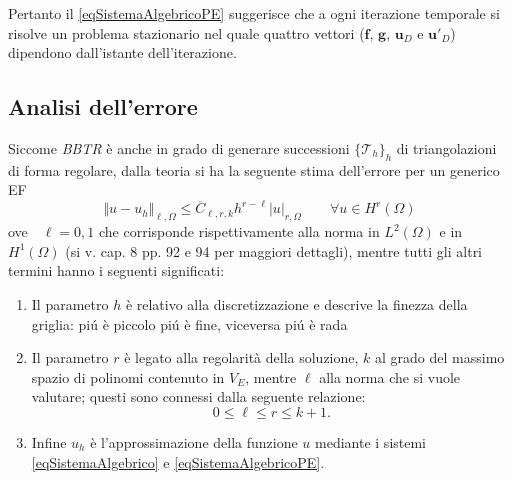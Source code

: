 \documentclass{article}
\begin{document}
            Pertanto il \eqref{eqSistemaAlgebricoPE} suggerisce che a ogni iterazione temporale si risolve un problema stazionario nel quale quattro vettori ($\mathbf f$, $\mathbf g$, $\mathbf u_D$ e $\mathbf u'_D$) dipendono dall'istante dell'iterazione.


        \subsection{Analisi dell'errore}\label{parAnalisiErrore} %

            Siccome \textit{BBTR} è anche in grado di generare successioni $\{\mathcal T_h\}_h$ di triangolazioni di forma regolare, dalla teoria si ha la seguente stima dell'errore per un generico EF
            \begin{equation*}
                \Vert u-u_h\Vert_{\ell,\Omega}
                \leq \overline C_{\ell,r,k}h^{r-\ell}\vert u\vert_{r,\Omega}
                \quad\quad\forall u\in H^r(\Omega)
                \label{eqErroreGlobaleGenerale}
            \end{equation*}
            ove\ \ $\ell=0,1$ che corrisponde rispettivamente alla norma in $L^2(\Omega)$ e in $H^1(\Omega)$ (si v. \cite{dispenseMEDèPA} cap. 8 pp. 92 e 94 per maggiori dettagli), mentre tutti gli altri termini hanno i seguenti significati:

            \begin{enumerate}[label=\arabic*.,  %
                            itemsep=0pt,        %
                            leftmargin=12.5pt]    %
            
                \item Il parametro $h$ è relativo alla discretizzazione e descrive la finezza della griglia: piú è piccolo piú è fine, viceversa piú è rada
                
                \item Il parametro $r$ è legato alla regolarità della soluzione, $k$ al grado del massimo spazio di polinomi contenuto in $V_E$, mentre $\ell$ alla norma che si vuole valutare; questi sono connessi dalla seguente relazione:
                \begin{equation*}
                    0\le\ell\le r\le k+1.
                    \label{eqLegameParametriErroreGlobale} 
                \end{equation*}
                
                \item Infine $u_h$ è l'approssimazione della funzione $u$ mediante i sistemi \eqref{eqSistemaAlgebrico} e \eqref{eqSistemaAlgebricoPE}.

            \end{enumerate}
\end{document}
